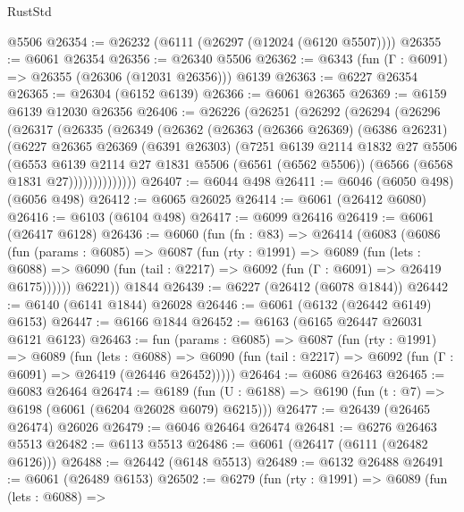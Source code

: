 \begin{lexlean}{RustStd}
\begin{coremodule}
{\begin{coremodule}
{{{{{{{{{{{{{{{{{{{{{{{{{{    @5506
@26354 := @26232 (@6111 (@26297 (@12024 (@6120 @5507))))
@26355 := @6061 @26354
@26356 := @26340 @5506
@26362 := @6343 (fun (Γ : @6091) => @26355 (@26306 (@12031 @26356))) @6139
@26363 := @6227 @26354
@26365 := @26304 (@6152 @6139)
@26366 := @6061 @26365
@26369 := @6159 @6139 @12030 @26356
@26406 := @26226
    (@26251
      (@26292
        (@26294
          (@26296
            (@26317
              (@26335
                (@26349
                  (@26362
                    (@26363
                      (@26366 @26369)
                      (@6386 @26231)
                      (@6227
                        @26365
                        @26369
                        (@6391 @26303)
                        (@7251
                          @6139
                          @2114
                          @1832
                          @27
                          @5506
                          (@6553
                            @6139
                            @2114
                            @27
                            @1831
                            @5506
                            (@6561 (@6562 @5506))
                            (@6566 (@6568 @1831 @27))))))))))))))
@26407 := @6044 @498
@26411 := @6046 (@6050 @498) (@6056 @498)
@26412 := @6065 @26025
@26414 := @6061 (@26412 @6080)
@26416 := @6103 (@6104 @498)
@26417 := @6099 @26416
@26419 := @6061 (@26417 @6128)
@26436 := @6060
    (fun (fn : @83) =>
    @26414
      (@6083
        (@6086
          (fun (params : @6085) =>
          @6087
            (fun (rty : @1991) =>
            @6089
              (fun (lets : @6088) =>
              @6090 (fun (tail : @2217) => @6092 (fun (Γ : @6091) => @26419 @6175))))))
        @6221))
    @1844
@26439 := @6227 (@26412 (@6078 @1844))
@26442 := @6140 (@6141 @1844) @26028
@26446 := @6061 (@6132 (@26442 @6149) @6153)
@26447 := @6166 @1844
@26452 := @6163 (@6165 @26447 @26031 @6121 @6123)
@26463 := fun (params : @6085) =>
  @6087
    (fun (rty : @1991) =>
    @6089
      (fun (lets : @6088) =>
      @6090 (fun (tail : @2217) => @6092 (fun (Γ : @6091) => @26419 (@26446 @26452)))))
@26464 := @6086 @26463
@26465 := @6083 @26464
@26474 := @6189
    (fun (U : @6188) => @6190 (fun (t : @7) => @6198 (@6061 (@6204 @26028 @6079) @6215)))
@26477 := @26439 (@26465 @26474) @26026
@26479 := @6046 @26464 @26474
@26481 := @6276 @26463 @5513
@26482 := @6113 @5513
@26486 := @6061 (@26417 (@6111 (@26482 @6126)))
@26488 := @26442 (@6148 @5513)
@26489 := @6132 @26488
@26491 := @6061 (@26489 @6153)
@26502 := @6279
    (fun (rty : @1991) =>
    @6089
      (fun (lets : @6088) =>
}}}}}}}}}}}}}}}}}}}}}}}}}}
\end{coremodule}}
\end{coremodule}
\end{lexlean}
